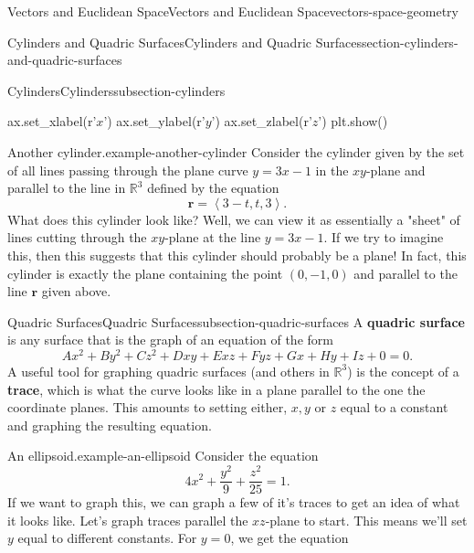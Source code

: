 \documentclass[oneside,10pt,]{book}
\newcommand{\terminology}[1]{\textbf{#1}}
\numberwithin{equation}{section}
\newcommand{\RR}{\mathbb{R}}
\newcommand{\vv}[1]{\mathbf{#1}}
\newcommand{\dotprod}[1]{\left\langle #1 \right\rangle}
\begin{document}
\begin{chapterptx}{Vectors and Euclidean Space}{}{Vectors and Euclidean Space}{}{}{vectors-space-geometry}
\begin{sectionptx}{Cylinders and Quadric Surfaces}{}{Cylinders and Quadric Surfaces}{}{}{section-cylinders-and-quadric-surfaces}
\begin{subsectionptx}{Cylinders}{}{Cylinders}{}{}{subsection-cylinders}
\begin{sageinput}
ax.set_xlabel(r'$x$')
ax.set_ylabel(r'$y$')
ax.set_zlabel(r'$z$')
plt.show()
\end{sageinput}
\begin{example}{Another cylinder.}{example-another-cylinder}%
\hypertarget{p-1239}{}%
Consider the cylinder given by the set of all lines passing through the plane curve \(y = 3x-1\) in the \(xy\)-plane and parallel to the line in \(\RR^{3}\) defined by the equation%
%
\begin{equation*}
\vv{r} = \dotprod{3-t,t,3}.
\end{equation*}
\hypertarget{p-1240}{}%
What does this cylinder look like? Well, we can view it as essentially a "sheet" of lines cutting through the \(xy\)-plane at the line \(y = 3x-1\). If we try to imagine this, then this suggests that this cylinder should probably be a plane! In fact, this cylinder is exactly the plane containing the point \((0,-1,0)\) and parallel to the line \(\vv{r}\) given above.%
\end{example}
\end{subsectionptx}
%
%
\typeout{************************************************}
\typeout{************************************************}
%
\begin{subsectionptx}{Quadric Surfaces}{}{Quadric Surfaces}{}{}{subsection-quadric-surfaces}
\hypertarget{p-1241}{}%
A \terminology{quadric surface} is any surface that is the graph of an equation of the form%
%
\begin{equation*}
Ax^{2}+By^{2}+Cz^{2}+Dxy+Exz+Fyz+Gx+Hy+Iz+0 = 0.
\end{equation*}
\hypertarget{p-1242}{}%
A useful tool for graphing quadric surfaces (and others in \(\RR^{3}\)) is the concept of a \terminology{trace}, which is what the curve looks like in a plane parallel to the one the coordinate planes. This amounts to setting either, \(x,y\) or \(z\) equal to a constant and graphing the resulting equation.%
\begin{example}{An ellipsoid.}{example-an-ellipsoid}%
\hypertarget{p-1243}{}%
Consider the equation%
%
\begin{equation*}
4x^{2}+\frac{y^{2}}{9}+\frac{z^{2}}{25} = 1.
\end{equation*}
\hypertarget{p-1244}{}%
If we want to graph this, we can graph a few of it's traces to get an idea of what it looks like. Let's graph traces parallel the \(xz\)-plane to start. This means we'll set \(y\) equal to different constants. For \(y=0\), we get the equation%
%
\begin{equation*}

\end{equation*}
\end{example}
\end{subsectionptx}
\end{sectionptx}
\end{chapterptx}
\end{document}
